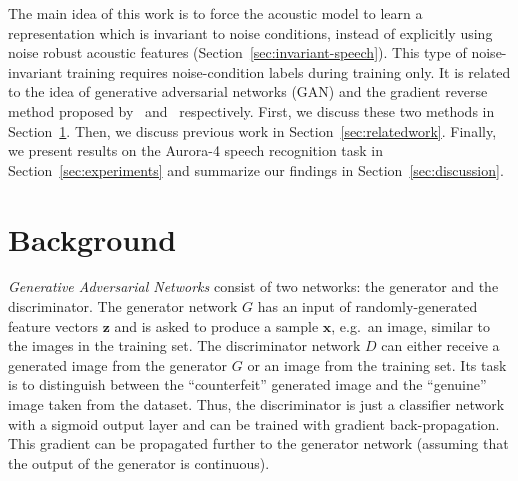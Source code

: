 \documentclass[a4paper]{article}
\begin{document}
    The main idea of this work is to force the acoustic model 
    to learn a representation which is invariant to noise conditions, instead of 
    explicitly using noise robust acoustic features 
    (Section~\ref{sec:invariant-speech}). This type of noise-invariant 
    training requires noise-condition labels during training only. It is 
    related to the idea of generative adversarial networks (GAN) and the 
    gradient reverse method proposed by~\cite{goodfellow2014generative} 
    and~\cite{ganin2014unsupervised} respectively. 
    First, we discuss these two methods in Section~\ref{sec:background}.
    Then, we discuss previous work in Section~\ref{sec:relatedwork}. 
    Finally, we present results on the Aurora-4 speech 
    recognition task in Section~\ref{sec:experiments} and summarize 
    our findings in Section~\ref{sec:discussion}.

\section{Background}
\label{sec:background}
\emph{Generative Adversarial Networks} consist of two networks: the generator and the discriminator. 
    The generator network $G$ has an
    input of randomly-generated feature vectors $\bm{z}$ and is asked to produce a
    sample $\bm{x}$, e.g.\ an image, similar to the images in the training set. The discriminator network $D$
    can either receive a generated image from the generator $G$ or an image
    from the training set. Its task is to distinguish
    between the ``counterfeit'' generated image and the ``genuine'' image taken from the dataset. Thus,
    the discriminator is just a classifier network with a sigmoid output layer
    and can be trained with gradient back-propagation. This gradient can be propagated further
    to the generator network (assuming that the output of the generator is
    continuous).
\end{document}
